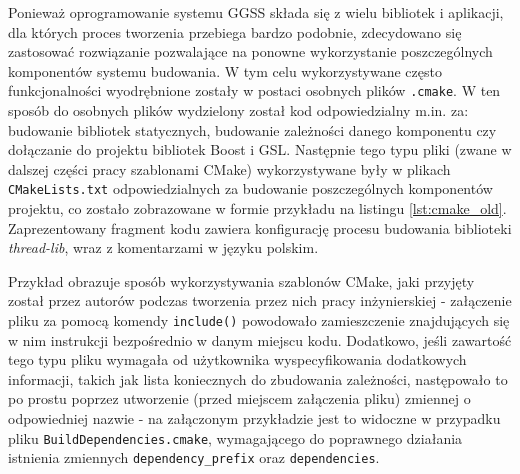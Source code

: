 Ponieważ oprogramowanie systemu GGSS składa się z wielu bibliotek i aplikacji, dla których proces tworzenia przebiega bardzo podobnie, zdecydowano się zastosować rozwiązanie pozwalające na ponowne wykorzystanie poszczególnych komponentów systemu budowania. W tym celu wykorzystywane często funkcjonalności wyodrębnione zostały w postaci osobnych plików \lstinline{.cmake}. W ten sposób do osobnych plików wydzielony został kod odpowiedzialny m.in. za: budowanie bibliotek statycznych, budowanie zależności danego komponentu czy dołączanie do projektu bibliotek Boost i GSL. Następnie tego typu pliki (zwane w dalszej części pracy szablonami CMake) wykorzystywane były w plikach \lstinline{CMakeLists.txt} odpowiedzialnych za budowanie poszczególnych komponentów projektu, co zostało zobrazowane w formie przykładu na listingu \ref{lst:cmake_old}. Zaprezentowany fragment kodu zawiera konfigurację procesu budowania biblioteki \emph{thread-lib}, wraz z komentarzami w języku polskim. 



Przykład obrazuje sposób wykorzystywania szablonów CMake, jaki przyjęty został przez autorów podczas tworzenia przez nich pracy inżynierskiej - załączenie pliku za pomocą komendy \lstinline{include()} powodowało zamieszczenie znajdujących się w nim instrukcji bezpośrednio w danym miejscu kodu. Dodatkowo, jeśli zawartość tego typu pliku wymagała od użytkownika wyspecyfikowania dodatkowych informacji, takich jak lista koniecznych do zbudowania zależności, następowało to po prostu poprzez utworzenie (przed miejscem załączenia pliku) zmiennej o odpowiedniej nazwie - na załączonym przykładzie jest to widoczne w przypadku pliku \lstinline{BuildDependencies.cmake}, wymagającego do poprawnego działania istnienia zmiennych \lstinline{dependency_prefix} oraz \lstinline{dependencies}.

